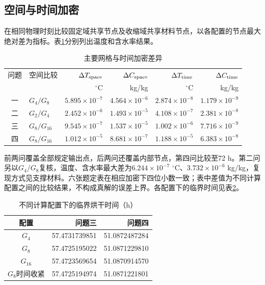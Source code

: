 \subsection{空间与时间加密}
在相同物理时刻比较固定域共享节点及收缩域共享材料节点，以各配置的节点最大绝对差为指标。表\ref{tab_convergence}分别列出温度和含水率结果。
\begin{table}[htbp]\centering\small
\caption{主要网格与时间加密差异}\label{tab_convergence}
\begin{tabular}{clrrrr}\toprule
问题 & 空间比较 & $\Delta T_{\rm space}$ & $\Delta C_{\rm space}$ & $\Delta T_{\rm time}$ & $\Delta C_{\rm time}$\\
 & & $^\circ$C & kg/kg & $^\circ$C & kg/kg\\\midrule
一 & $G_4/G_8$ & $5.895\!\times\!10^{-7}$ & $4.564\!\times\!10^{-6}$ & $2.874\!\times\!10^{-8}$ & $1.179\!\times\!10^{-9}$\\
二 & $G_2/G_4$ & $2.452\!\times\!10^{-6}$ & $1.493\!\times\!10^{-5}$ & $4.108\!\times\!10^{-7}$ & $2.381\!\times\!10^{-8}$\\
三 & $G_8/G_{16}$ & $9.545\!\times\!10^{-7}$ & $1.537\!\times\!10^{-5}$ & $1.002\!\times\!10^{-6}$ & $7.716\!\times\!10^{-9}$\\
四 & $G_8/G_{16}$ & $1.012\!\times\!10^{-5}$ & $8.681\!\times\!10^{-7}$ & $1.188\!\times\!10^{-5}$ & $6.383\!\times\!10^{-8}$\\\bottomrule
\end{tabular}
\end{table}
前两问覆盖全部规定输出点，后两问还覆盖内部节点，第四问比较至72 h。第二问另以$G_4/G_8$复核，温度、含水率最大差为$6.244\times10^{-7}$ $^\circ$C、$3.732\times10^{-6}$ kg/kg，复现方式见支撑材料。六张题定表在相应加密下四位小数一致；表中差值为不同计算配置之间的比较结果，不构成真解的误差上界。各配置下的临界时间见表\ref{tab_event_convergence}。
\begin{table}[htbp]\centering\small
\caption{不同计算配置下的临界烘干时间（h）}\label{tab_event_convergence}
\begin{tabular}{crr}\toprule
配置 & 问题三 & 问题四\\\midrule
$G_4$ & 57.4731739851 & 51.0872487284\\
$G_8$ & 57.4725195022 & 51.0871229810\\
$G_{16}$ & 57.4723569654 & 51.0870914570\\
$G_8$时间收紧 & 57.4725194974 & 51.0871221801\\\bottomrule
\end{tabular}
\end{table}

